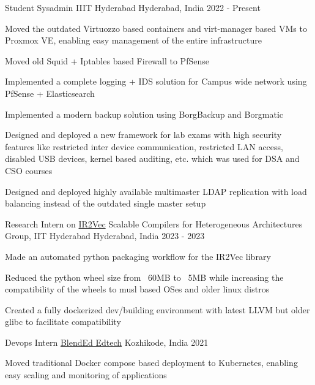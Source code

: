 
\begin{cventries}
	\cventry
	  {Student Sysadmin} %
	  {IIIT Hyderabad} %
	  {Hyderabad, India} %
	  {2022 - Present} %
	  {
		\begin{cvitems} %
		  \item {Moved the outdated Virtuozzo based containers and virt-manager based VMs to Proxmox VE, enabling easy management of the entire infrastructure}
		  \item {Moved old Squid + Iptables based Firewall to PfSense}
		  \item {Implemented a complete logging + IDS solution for Campus wide network using PfSense + Elasticsearch}
		  \item {Implemented a modern backup solution using BorgBackup and Borgmatic}
		  \item {Designed and deployed a new framework for lab exams with high security features like restricted inter device communication, restricted LAN access, disabled USB devices, kernel based auditing, etc. which was used for DSA and CSO courses}
		  \item {Designed and deployed highly available multimaster LDAP replication with load balancing instead of the outdated single master setup}
		\end{cvitems}
	  }
    
    
	\cventry
    {Research Intern on \href{https://github.com/IITH-Compilers/IR2Vec}{IR2Vec}} %
    {Scalable Compilers for Heterogeneous Architectures Group, IIT Hyderabad} %
    {Hyderabad, India} %
    {2023 - 2023} %
    {
      \begin{cvitems} %
        \item {Made an automated python packaging workflow for the IR2Vec library}
        \item {Reduced the python wheel size from ~60MB to ~5MB while increasing the compatibility of the wheels to musl based OSes and older linux distros}
        \item {Created a fully dockerized dev/building environment with latest LLVM but older glibc to facilitate compatibility}
      \end{cvitems}
    }
    
    
  \cventry
    {Devops Intern} %
    {\href{https://blend-ed.org/}{BlendEd Edtech}} %
    {Kozhikode, India} %
    {2021} %
    {
      \begin{cvitems} %
        \item {Moved traditional Docker compose based deployment to Kubernetes, enabling easy scaling and monitoring of applications}
      \end{cvitems}
    }
    

\end{cventries}
